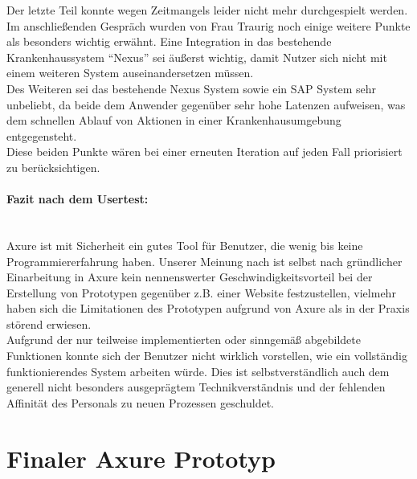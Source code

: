\documentclass[a4paper, ngerman, 12pt]{scrartcl}
\begin{document}
Der letzte Teil konnte wegen Zeitmangels leider nicht mehr durchgespielt werden.\\
 
Im anschließenden Gespräch wurden von Frau Traurig noch einige weitere Punkte als besonders wichtig erwähnt. Eine Integration in das bestehende Krankenhaussystem “Nexus” sei äußerst wichtig, damit Nutzer sich nicht mit einem weiteren System auseinandersetzen müssen.\\

Des Weiteren sei das bestehende Nexus System sowie ein SAP System sehr unbeliebt, da beide dem Anwender gegenüber sehr hohe Latenzen aufweisen, was dem schnellen Ablauf von Aktionen in einer Krankenhausumgebung entgegensteht.\\
 
Diese beiden Punkte wären bei einer erneuten Iteration auf jeden Fall priorisiert zu berücksichtigen.

\paragraph{Fazit nach dem Usertest:}\leavevmode\\
Axure ist mit Sicherheit ein gutes Tool für Benutzer, die wenig bis keine Programmiererfahrung haben. Unserer Meinung nach ist selbst nach gründlicher Einarbeitung in Axure kein nennenswerter Geschwindigkeitsvorteil bei der Erstellung von Prototypen gegenüber z.B. einer Website festzustellen, vielmehr haben sich die Limitationen des Prototypen aufgrund von Axure als in der Praxis störend erwiesen.\\

Aufgrund der nur teilweise implementierten oder sinngemäß abgebildete Funktionen konnte sich der Benutzer nicht wirklich vorstellen, wie ein vollständig funktionierendes System arbeiten würde. Dies ist selbstverständlich auch dem generell nicht besonders ausgeprägtem Technikverständnis und der fehlenden Affinität des Personals zu neuen Prozessen geschuldet.
\section{Finaler Axure Prototyp}
\end{document}
